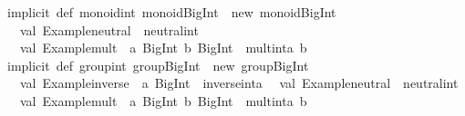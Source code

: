 \begin{isabellebody}
\begin{isamarkuptext}
\isanewline
implicit\ def\ monoid{}int{}\ monoid{}BigInt{}\ {}\ new\ monoid{}BigInt{}\ {}\isanewline
\ \ val\ {}Example{}neutral{}\ {}\ neutral{}int\isanewline
\ \ val\ {}Example{}mult{}\ {}\ {}a{}\ BigInt{}\ b{}\ BigInt{}\ {}{}\ mult{}int{}a{}\ b{}\isanewline
{}\isanewline
\isanewline
implicit\ def\ group{}int{}\ group{}BigInt{}\ {}\ new\ group{}BigInt{}\ {}\isanewline
\ \ val\ {}Example{}inverse{}\ {}\ {}a{}\ BigInt{}\ {}{}\ inverse{}int{}a{}\isanewline
\ \ val\ {}Example{}neutral{}\ {}\ neutral{}int\isanewline
\ \ val\ {}Example{}mult{}\ {}\ {}a{}\ BigInt{}\ b{}\ BigInt{}\ {}{}\ mult{}int{}a{}\ b{}\isanewline

\end{isamarkuptext}
\end{isabellebody}
